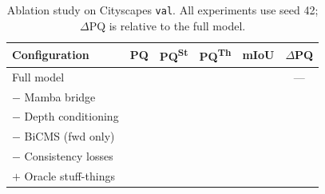 \documentclass{article}
\begin{document}
\begin{table}[t]
\centering
\caption{Ablation study on Cityscapes \texttt{val}. All experiments use seed 42; $\Delta$PQ is relative to the full model.}
\label{tab:ablations}
\begin{tabular}{lccccc}
\toprule
\textbf{Configuration} & \textbf{PQ} & \textbf{PQ\textsuperscript{St}} & \textbf{PQ\textsuperscript{Th}} & \textbf{mIoU} & $\Delta$\textbf{PQ} \\
\midrule
Full model & \underline{\hspace{2em}} & \underline{\hspace{2em}} & \underline{\hspace{2em}} & \underline{\hspace{2em}} & --- \\
\midrule
$-$ Mamba bridge & \underline{\hspace{2em}} & \underline{\hspace{2em}} & \underline{\hspace{2em}} & \underline{\hspace{2em}} & \underline{\hspace{2em}} \\
$-$ Depth conditioning & \underline{\hspace{2em}} & \underline{\hspace{2em}} & \underline{\hspace{2em}} & \underline{\hspace{2em}} & \underline{\hspace{2em}} \\
$-$ BiCMS (fwd only) & \underline{\hspace{2em}} & \underline{\hspace{2em}} & \underline{\hspace{2em}} & \underline{\hspace{2em}} & \underline{\hspace{2em}} \\
$-$ Consistency losses & \underline{\hspace{2em}} & \underline{\hspace{2em}} & \underline{\hspace{2em}} & \underline{\hspace{2em}} & \underline{\hspace{2em}} \\
\midrule
$+$ Oracle stuff-things & \underline{\hspace{2em}} & \underline{\hspace{2em}} & \underline{\hspace{2em}} & \underline{\hspace{2em}} & \underline{\hspace{2em}} \\
\bottomrule
\end{tabular}
\end{table}
\end{document}
